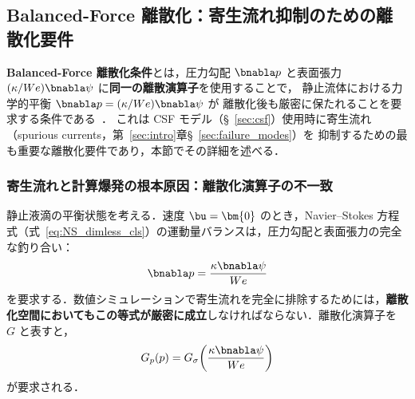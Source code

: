 \subsection{Balanced-Force 離散化：寄生流れ抑制のための離散化要件}
\label{sec:balanced_force}

\textbf{Balanced-Force 離散化条件}とは，圧力勾配 $\bnabla p$ と表面張力
$(\kappa/We)\bnabla\psi$ に\textbf{同一の離散演算子}を使用することで，
静止流体における力学的平衡 $\bnabla p = (\kappa/We)\bnabla\psi$ が
離散化後も厳密に保たれることを要求する条件である~\cite{Francois2006}．
これは CSF モデル（§~\ref{sec:csf}）使用時に寄生流れ（spurious currents，第~\ref{sec:intro}章§~\ref{sec:failure_modes}）を
抑制するための最も重要な離散化要件であり，本節でその詳細を述べる．

\subsubsection{寄生流れと計算爆発の根本原因：離散化演算子の不一致}
\label{sec:bf_operator_mismatch}

静止液滴の平衡状態を考える．速度 $\bu=\bm{0}$ のとき，Navier--Stokes 方程式（式~\eqref{eq:NS_dimless_cls}）の運動量バランスは，圧力勾配と表面張力の完全な釣り合い：
\[
  \bnabla p = \frac{\kappa\bnabla\psi}{We}
\]
を要求する．数値シミュレーションで寄生流れを完全に排除するためには，\textbf{離散化空間においてもこの等式が厳密に成立}しなければならない．離散化演算子を $G$ と表すと，
\[
  G_p(p) = G_\sigma\!\left(\frac{\kappa\bnabla\psi}{We}\right)
\]
が要求される．

